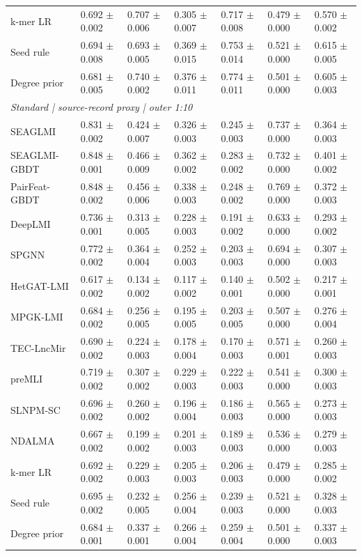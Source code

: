 \begin{landscape}
{\begin{longtable}{lllllll}
k-mer LR & 0.692 $\pm$ 0.002 & 0.707 $\pm$ 0.006 & 0.305 $\pm$ 0.007 & 0.717 $\pm$ 0.008 & 0.479 $\pm$ 0.000 & 0.570 $\pm$ 0.002 \\
Seed rule & 0.694 $\pm$ 0.008 & 0.693 $\pm$ 0.005 & 0.369 $\pm$ 0.015 & 0.753 $\pm$ 0.014 & 0.521 $\pm$ 0.000 & 0.615 $\pm$ 0.005 \\
Degree prior & 0.681 $\pm$ 0.005 & 0.740 $\pm$ 0.002 & 0.376 $\pm$ 0.011 & 0.774 $\pm$ 0.011 & 0.501 $\pm$ 0.000 & 0.605 $\pm$ 0.003 \\
\multicolumn{7}{l}{\textit{Standard | source-record proxy | outer 1:10}}\\
SEAGLMI & 0.831 $\pm$ 0.002 & 0.424 $\pm$ 0.007 & 0.326 $\pm$ 0.003 & 0.245 $\pm$ 0.003 & 0.737 $\pm$ 0.000 & 0.364 $\pm$ 0.003 \\
SEAGLMI-GBDT & 0.848 $\pm$ 0.001 & 0.466 $\pm$ 0.009 & 0.362 $\pm$ 0.002 & 0.283 $\pm$ 0.002 & 0.732 $\pm$ 0.000 & 0.401 $\pm$ 0.002 \\
PairFeat-GBDT & 0.848 $\pm$ 0.002 & 0.456 $\pm$ 0.006 & 0.338 $\pm$ 0.003 & 0.248 $\pm$ 0.002 & 0.769 $\pm$ 0.000 & 0.372 $\pm$ 0.003 \\
DeepLMI & 0.736 $\pm$ 0.001 & 0.313 $\pm$ 0.005 & 0.228 $\pm$ 0.003 & 0.191 $\pm$ 0.002 & 0.633 $\pm$ 0.000 & 0.293 $\pm$ 0.002 \\
SPGNN & 0.772 $\pm$ 0.002 & 0.364 $\pm$ 0.004 & 0.252 $\pm$ 0.003 & 0.203 $\pm$ 0.003 & 0.694 $\pm$ 0.000 & 0.307 $\pm$ 0.003 \\
HetGAT-LMI & 0.617 $\pm$ 0.002 & 0.134 $\pm$ 0.002 & 0.117 $\pm$ 0.002 & 0.140 $\pm$ 0.001 & 0.502 $\pm$ 0.000 & 0.217 $\pm$ 0.001 \\
MPGK-LMI & 0.684 $\pm$ 0.002 & 0.256 $\pm$ 0.005 & 0.195 $\pm$ 0.005 & 0.203 $\pm$ 0.005 & 0.507 $\pm$ 0.000 & 0.276 $\pm$ 0.004 \\
TEC-LncMir & 0.690 $\pm$ 0.002 & 0.224 $\pm$ 0.003 & 0.178 $\pm$ 0.004 & 0.170 $\pm$ 0.003 & 0.571 $\pm$ 0.001 & 0.260 $\pm$ 0.003 \\
preMLI & 0.719 $\pm$ 0.002 & 0.307 $\pm$ 0.002 & 0.229 $\pm$ 0.003 & 0.222 $\pm$ 0.003 & 0.541 $\pm$ 0.000 & 0.300 $\pm$ 0.003 \\
SLNPM-SC & 0.696 $\pm$ 0.002 & 0.260 $\pm$ 0.002 & 0.196 $\pm$ 0.004 & 0.186 $\pm$ 0.003 & 0.565 $\pm$ 0.000 & 0.273 $\pm$ 0.003 \\
NDALMA & 0.667 $\pm$ 0.002 & 0.199 $\pm$ 0.002 & 0.201 $\pm$ 0.003 & 0.189 $\pm$ 0.003 & 0.536 $\pm$ 0.000 & 0.279 $\pm$ 0.003 \\
k-mer LR & 0.692 $\pm$ 0.002 & 0.229 $\pm$ 0.003 & 0.205 $\pm$ 0.003 & 0.206 $\pm$ 0.003 & 0.479 $\pm$ 0.000 & 0.285 $\pm$ 0.002 \\
Seed rule & 0.695 $\pm$ 0.002 & 0.232 $\pm$ 0.005 & 0.256 $\pm$ 0.004 & 0.239 $\pm$ 0.003 & 0.521 $\pm$ 0.000 & 0.328 $\pm$ 0.003 \\
Degree prior & 0.684 $\pm$ 0.001 & 0.337 $\pm$ 0.001 & 0.266 $\pm$ 0.004 & 0.259 $\pm$ 0.004 & 0.501 $\pm$ 0.000 & 0.337 $\pm$ 0.003 \\
\end{longtable}
}
\end{landscape}
